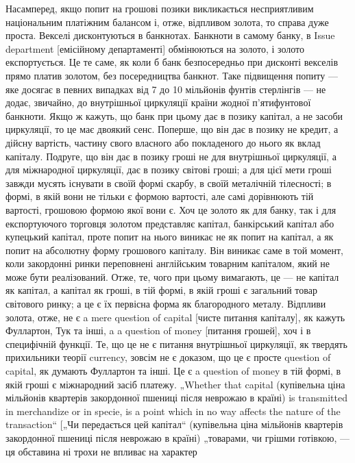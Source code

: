 Насамперед, якщо попит на грошові позики викликається несприятливим
національним платіжним балансом і, отже, відпливом
золота, то справа дуже проста. Векселі дисконтуються в банкнотах.
Банкноти в самому банку, в Issue department [емісійному
департаменті] обмінюються на золото, і золото експортується.
Це те саме, як коли б банк безпосередньо при дисконті
векселів прямо платив золотом, без посередництва банкнот. Таке
підвищення попиту — яке досягає в певних випадках від 7 до
10 мільйонів фунтів стерлінгів — не додає, звичайно, до внутрішньої
циркуляції країни жодної п’ятифунтової банкноти. Якщо ж
кажуть, що банк при цьому дає в позику капітал, а не засоби
циркуляції, то це має двоякий сенс. Поперше, що він дає в позику
не кредит, а дійсну вартість, частину свого власного або
покладеного до нього як вклад капіталу. Подруге, що він дає
в позику гроші не для внутрішньої циркуляції, а для міжнародної
циркуляції, дає в позику світові гроші; а для цієї мети гроші
завжди мусять існувати в своїй формі скарбу, в своїй металічній
тілесності; в формі, в якій вони не тільки є формою вартості, але
самі дорівнюють тій вартості, грошовою формою якої вони є. Хоч
це золото як для банку, так і для експортуючого торговця золотом
представляє капітал, банкірський капітал або купецький капітал,
проте попит на нього виникає не як попит на капітал, а як попит
на абсолютну форму грошового капіталу. Він виникає саме в той
момент, коли закордонні ринки переповнені англійським товарним
капіталом, який не може бути реалізований. Отже, те, чого при
цьому вимагають, це — не капітал як капітал, а капітал як гроші, в
тій формі, в якій гроші є загальний товар світового ринку; а це є їх
первісна форма як благородного металу. Відпливи золота, отже,
не є a mere question of capital [чисте питання капіталу], як кажуть
Фуллартон, Тук та інші, a a question of money [питання грошей],
хоч і в специфічній функції. Те, що це не є питання
внутрішньої циркуляції, як твердять прихильники теорії currency,
зовсім не є доказом, що це є просте question of capital, як думають
Фуллартон та інші. Це є a question of money в тій формі, в якій
гроші є міжнародний засіб платежу. „Whether that capital (купівельна
ціна мільйонів квартерів закордонної пшениці після
неврожаю в країні) is transmitted in merchandize or in specie, is
a point which in no way affects the nature of the transaction“ [„Чи
передається цей капітал“ (купівельна ціна мільйонів квартерів
закордонної пшениці після неврожаю в країні) „товарами, чи
грішми готівкою, — ця обставина ні трохи не впливає на характер

